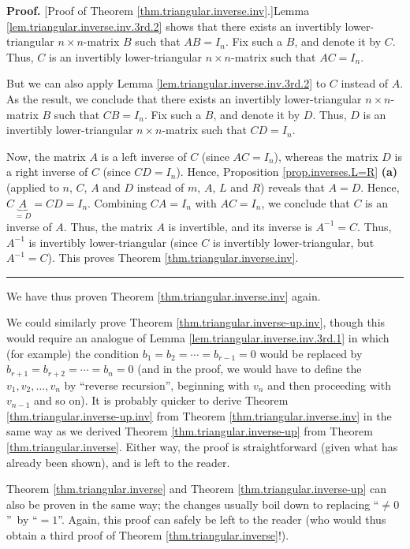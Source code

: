 \documentclass[numbers=enddot,12pt,final,onecolumn,notitlepage]{scrartcl}%
\theoremstyle{definition}
\newenvironment{proof}[1][Proof]{\noindent\textbf{#1.} }{\ \rule{0.5em}{0.5em}}
\begin{document}
\begin{proof}
[Proof of Theorem \ref{thm.triangular.inverse.inv}.]Lemma
\ref{lem.triangular.inverse.inv.3rd.2} shows that there exists an invertibly
lower-triangular $n\times n$-matrix $B$ such that $AB=I_{n}$. Fix such a $B$,
and denote it by $C$. Thus, $C$ is an invertibly lower-triangular $n\times
n$-matrix such that $AC=I_{n}$.

But we can also apply Lemma \ref{lem.triangular.inverse.inv.3rd.2} to $C$
instead of $A$. As the result, we conclude that there exists an invertibly
lower-triangular $n\times n$-matrix $B$ such that $CB=I_{n}$. Fix such a $B$,
and denote it by $D$. Thus, $D$ is an invertibly lower-triangular $n\times
n$-matrix such that $CD=I_{n}$.

Now, the matrix $A$ is a left inverse of $C$ (since $AC=I_{n}$), whereas the
matrix $D$ is a right inverse of $C$ (since $CD=I_{n}$). Hence, Proposition
\ref{prop.inverses.L=R} \textbf{(a)} (applied to $n$, $C$, $A$ and $D$ instead
of $m$, $A$, $L$ and $R$) reveals that $A=D$. Hence, $C\underbrace{A}%
_{=D}=CD=I_{n}$. Combining $CA=I_{n}$ with $AC=I_{n}$, we conclude that $C$ is
an inverse of $A$. Thus, the matrix $A$ is invertible, and its inverse is
$A^{-1}=C$. Thus, $A^{-1}$ is invertibly lower-triangular (since $C$ is
invertibly lower-triangular, but $A^{-1}=C$). This proves Theorem
\ref{thm.triangular.inverse.inv}.
\end{proof}

We have thus proven Theorem \ref{thm.triangular.inverse.inv} again.

We could similarly prove Theorem \ref{thm.triangular.inverse-up.inv}, though
this would require an analogue of Lemma \ref{lem.triangular.inverse.inv.3rd.1}
in which (for example) the condition $b_{1}=b_{2}=\cdots=b_{r-1}=0$ would be
replaced by $b_{r+1}=b_{r+2}=\cdots=b_{n}=0$ (and in the proof, we would have
to define the $v_{1},v_{2},\ldots,v_{n}$ by \textquotedblleft reverse
recursion\textquotedblright, beginning with $v_{n}$ and then proceeding with
$v_{n-1}$ and so on). It is probably quicker to derive Theorem
\ref{thm.triangular.inverse-up.inv} from Theorem
\ref{thm.triangular.inverse.inv} in the same way as we derived Theorem
\ref{thm.triangular.inverse-up} from Theorem \ref{thm.triangular.inverse}.
Either way, the proof is straightforward (given what has already been shown),
and is left to the reader.

Theorem \ref{thm.triangular.inverse} and Theorem
\ref{thm.triangular.inverse-up} can also be proven in the same way; the
changes usually boil down to replacing \textquotedblleft$\neq0$%
\textquotedblright\ by \textquotedblleft$=1$\textquotedblright. Again, this
proof can safely be left to the reader (who would thus obtain a third proof of
Theorem \ref{thm.triangular.inverse}!).
\end{document}
